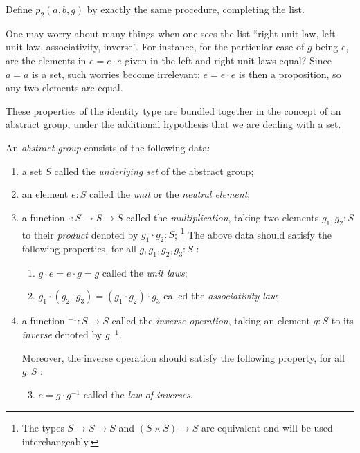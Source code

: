 \begin{xca}\label{xca:p2}
    Define $p_2(a,b,g)$ %
by exactly the same procedure, completing the list.
\end{xca}

\begin{remark}
   One may worry about many things when one sees the list ``right unit law, left unit law, associativity, inverse''.  For instance, for the particular case of $g$ being $e$, are the elements in $e=e\cdot e$ given in the left and right unit laws equal?  Since $a=a$ is a set, such worries become irrelevant: $e=e\cdot e$ is then a proposition, so any two elements are equal.
 \end{remark}

These properties of the identity type are bundled together in the concept of an abstract group, under the additional hypothesis that we are dealing with a set.

\begin{definition}\label{def:abstractgroup}
  \makeatletter %
  \renewcommand\p@enumii{}%
  \makeatother%
  An \emph{abstract group} consists of the following data:
  \begin{enumerate}
  \item a set $S$ called the \emph{underlying set} of the abstract group;
  \item an element $e:S$ called the \emph{unit} or the \emph{neutral element};
  \item\label{struc:mult-op} a function ${\cdot}: S\to S\to S$ called the \emph{multiplication},
    taking two elements $g_1,g_2:S$ to their \emph{product} denoted by $g_1\cdot g_2:S$;
\footnote{The types $S\to S\to S$ and $(S\times S)\to S$ are equivalent
and will be used interchangeably.}
\noindent The above data should satisfy the following properties, for all $g,g_1,g_2,g_3:S$ :
    \begin{enumerate}
    \item\label{axiom:unit-laws} %
      $g\cdot e=e\cdot g=g$ called the \emph{unit laws};
    \item\label{axiom:ass-law} %
      $g_1\cdot(g_2\cdot g_3)=(g_1\cdot g_2)\cdot g_3$ called the \emph{associativity law};
  \end{enumerate}
  \item\label{struc:inv-op} a function ${}^{-1}: S\to S$ called the \emph{inverse operation},
    taking an element $g:S$ to its \emph{inverse} denoted by $g^{-1}$.

    \noindent Moreover, the inverse operation should satisfy the
    following property, for all $g:S$ :
\begin{enumerate}\setcounter{enumii}{2}
    \item\label{axiom:inv-law} %
      $ e = g\cdot g^{-1}$ called the \emph{law of inverses}.
    \end{enumerate}
  \end{enumerate}
\end{definition} 

